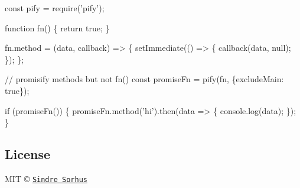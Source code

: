 \begin{DoxyCode}
const pify = require('pify');

function fn() \{
  return true;
\}

fn.method = (data, callback) => \{
  setImmediate(() => \{
    callback(data, null);
  \});
\};

// promisify methods but not fn()
const promiseFn = pify(fn, \{excludeMain: true\});

if (promiseFn()) \{
  promiseFn.method('hi').then(data => \{
    console.log(data);
  \});
\}
\end{DoxyCode}


\subsection*{License}

M\+IT © \href{http://sindresorhus.com}{\tt Sindre Sorhus} 
